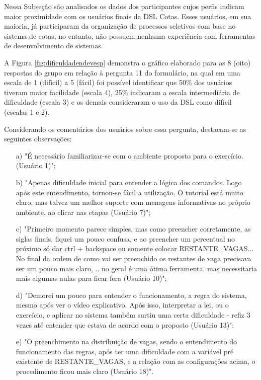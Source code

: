 Nessa Subseção são analisados os dados dos participantes cujos perfis indicam maior proximidade com os usuários finais da DSL Cotas. Esses usuários, em sua maioria, já participaram da organização de processos seletivos com base no sistema de cotas, no entanto, não possuem nenhuma experiência com ferramentas de desenvolvimento de sistemas.

A Figura \ref{fig:dificuldadendevesp} demonstra o gráfico elaborado para as 8 (oito) respostas do grupo em relação à pergunta 11 do formulário, na qual em uma escala de 1 (difícil) a 5 (fácil) foi possível identificar que 50\% dos usuários tiveram maior facilidade (escala 4), 25\% indicaram a escala intermediária de dificuldade (escala 3) e os demais consideraram o uso da DSL como difícil (escalas 1 e 2). 



Considerando os comentários dos usuários sobre essa pergunta, destacam-se as seguintes observações:

\begin{enumerate}
    \item [a)] "É necessário familiarizar-se com o ambiente proposto para o exercício.  (Usuário 1)";
    
    \item [b)] "Apenas dificuldade inicial para entender a lógica dos comandos. Logo após este entendimento, tornou-se fácil a utilização. O tutorial está muito claro, mas talvez um melhor suporte com menagens informativas no próprio ambiente, ao clicar nas etapas (Usuário 7)";
    
    \item [c)] "Primeiro momento parece simples, mas como preencher corretamente, as siglas finais, fiquei um pouco confusa, e ao preencher um percentual no próximo só dar ctrl + backspace ou somente colocar RESTANTE\_VAGAS... No final da ordem de como vai ser preenchido os restantes de vaga precisava ser um pouco mais claro, .. no geral é uma ótima ferramenta, mas necessitaria mais algumas aulas para ficar fera (Usuário 10)";
    
    \item [d)] "Demorei um pouco para entender o funcionamento, a regra do sistema, mesmo após ver o vídeo explicativo. Após isso, interpretar a lei, ou o exercício, e aplicar no sistema também surtiu uma certa dificuldade - refiz 3 vezes até entender que estava de acordo com o proposto (Usuário 13)";
    
    \item[e)] "O preenchimento na distribuição de vagas, sendo o entendimento do funcionamento das regras, após ter uma dificuldade com a variável pré existente de RESTANTE\_VAGAS, e a relação com as configurações acima, o procedimento ficou mais claro (Usuário 18)".
\end{enumerate}

